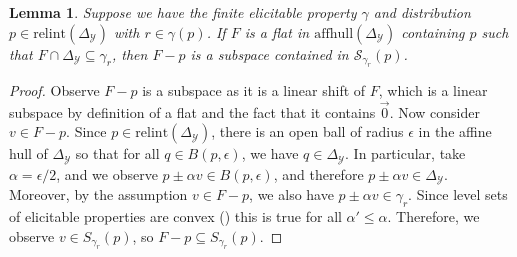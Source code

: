 \documentclass{article}
\newcommand{\Comments}{1}
\newcommand{\mynote}[2]{\ifnum\Comments=1\textcolor{#1}{#2}\fi}
\newcommand{\raf}[1]{\mynote{green}{[RF: #1]}}
\newcommand{\simplex}{\Delta_\Y}
\newcommand{\relint}[1]{\mathrm{relint}(#1)}
\renewcommand{\S}{\mathcal{S}}
\newcommand{\Y}{\mathcal{Y}}
\newtheorem{lemma}{Lemma}
\begin{document}
\begin{lemma}\label{lem:feas-sub-is-a-flat}
	Suppose we have the finite elicitable property $\gamma$ and distribution $p \in \relint{\simplex}$ with $r \in \gamma(p)$.
	If $F$ is a flat in $\mathrm{affhull}(\simplex)$ containing $p$ such that $F \cap \simplex \subseteq \gamma_r$, then $F - p$ is a subspace contained in $\S_{\gamma_r}(p)$.
\end{lemma}
\begin{proof}
  Observe $F-p$ is a subspace as it is a linear shift of $F$, which is a linear subspace by definition of a flat and the fact that it contains $\vec 0$.
  Now consider $v \in F - p$.
  Since $p \in \relint{\simplex}$, there is an open ball of radius $\epsilon$ in the affine hull of $\simplex$ so that for all $q \in B(p, \epsilon)$, we have $q \in \simplex$.
  In particular, take $\alpha = \epsilon / 2$, and we observe $p \pm \alpha v \in B(p, \epsilon)$, and therefore $p \pm \alpha v \in \simplex$.
  Moreover, by the assumption $v \in F - p$, we also have $p \pm \alpha v \in \gamma_r$. 
  Since level sets of elicitable properties are convex (\cite{lambert2009eliciting}) this is true for all $\alpha' \leq \alpha$.
  Therefore, we observe $v \in S_{\gamma_r}(p)$, so $F-p \subseteq S_{\gamma_r}(p)$.
%  
\end{proof}
\end{document}

